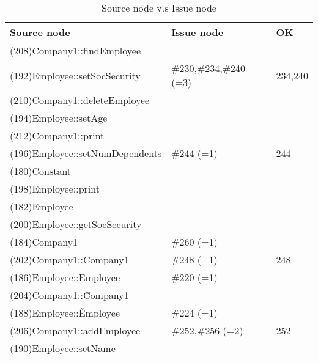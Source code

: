 \begin{table}[hb]
\begin{center}
\begin{tabular}{|l|l|l|}
\hline
Source node & Issue node  & OK\\
\hline
(208)Company1::findEmployee &  & \\
(192)Employee::setSocSecurity & \#230,\#234,\#240 (=3) & 234,240 \\
(210)Company1::deleteEmployee &  & \\
(194)Employee::setAge &  & \\
(212)Company1::print &  & \\
(196)Employee::setNumDependents & \#244 (=1) & 244\\
(180)Constant &  & \\
(198)Employee::print &  & \\
(182)Employee &  & \\
(200)Employee::getSocSecurity &  & \\
(184)Company1 & \#260 (=1) & \\
(202)Company1::Company1 & \#248 (=1) & 248\\
(186)Employee::Employee & \#220 (=1) & \\
(204)Company1::\~Company1 &  & \\
(188)Employee::\~Employee & \#224 (=1) & \\
(206)Company1::addEmployee & \#252,\#256 (=2) & 252\\
(190)Employee::setName &  & \\
\hline
\end{tabular}
\caption{Source node v.s Issue node}
\end{center}
\end{table}

%
